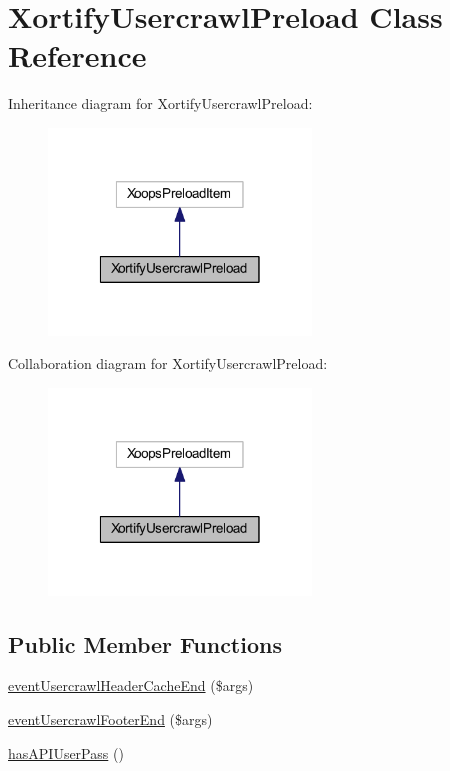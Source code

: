\hypertarget{class_xortify_usercrawl_preload}{\section{Xortify\-Usercrawl\-Preload Class Reference}
\label{class_xortify_usercrawl_preload}
}


Inheritance diagram for Xortify\-Usercrawl\-Preload\-:
\nopagebreak
\begin{figure}[H]
\begin{center}
\leavevmode
\includegraphics[width=198pt]{class_xortify_usercrawl_preload__inherit__graph}
\end{center}
\end{figure}


Collaboration diagram for Xortify\-Usercrawl\-Preload\-:
\nopagebreak
\begin{figure}[H]
\begin{center}
\leavevmode
\includegraphics[width=198pt]{class_xortify_usercrawl_preload__coll__graph}
\end{center}
\end{figure}
\subsection*{Public Member Functions}
\begin{DoxyCompactItemize}
\item 
\hyperlink{class_xortify_usercrawl_preload_ac2af80e68afcdf13313a117ae01a9a6c}{event\-Usercrawl\-Header\-Cache\-End} (\$args)
\item 
\hyperlink{class_xortify_usercrawl_preload_ad0df3ce79d7b6da3335c3fe84d777ce7}{event\-Usercrawl\-Footer\-End} (\$args)
\item 
\hyperlink{class_xortify_usercrawl_preload_a2ed534bf0ce75f3f5ea332fa6b373549}{has\-A\-P\-I\-User\-Pass} ()
\end{DoxyCompactItemize}


